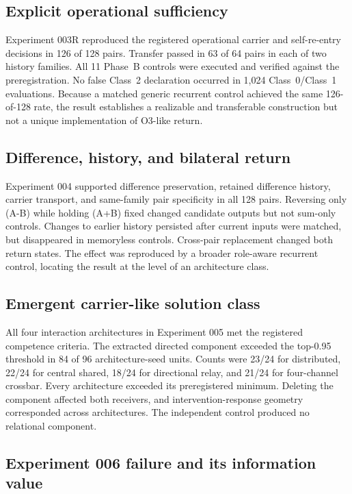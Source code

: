 \documentclass[11pt,a4paper]{article}
\begin{document}
\subsection{Explicit operational sufficiency}

Experiment 003R reproduced the registered operational carrier and self-re-entry decisions in 126 of 128 pairs. Transfer passed in 63 of 64 pairs in each of two history families. All 11 Phase~B controls were executed and verified against the preregistration. No false Class~2 declaration occurred in 1,024 Class~0/Class~1 evaluations. Because a matched generic recurrent control achieved the same 126-of-128 rate, the result establishes a realizable and transferable construction but not a unique implementation of O3-like return.

\subsection{Difference, history, and bilateral return}

Experiment 004 supported difference preservation, retained difference history, carrier transport, and same-family pair specificity in all 128 pairs. Reversing only (A-B) while holding (A+B) fixed changed candidate outputs but not sum-only controls. Changes to earlier history persisted after current inputs were matched, but disappeared in memoryless controls. Cross-pair replacement changed both return states. The effect was reproduced by a broader role-aware recurrent control, locating the result at the level of an architecture class.

\subsection{Emergent carrier-like solution class}

All four interaction architectures in Experiment 005 met the registered competence criteria. The extracted directed component exceeded the top-0.95 threshold in 84 of 96 architecture-seed units. Counts were 23/24 for distributed, 22/24 for central shared, 18/24 for directional relay, and 21/24 for four-channel crossbar. Every architecture exceeded its preregistered minimum. Deleting the component affected both receivers, and intervention-response geometry corresponded across architectures. The independent control produced no relational component.

\subsection{Experiment 006 failure and its information value}
\end{document}
